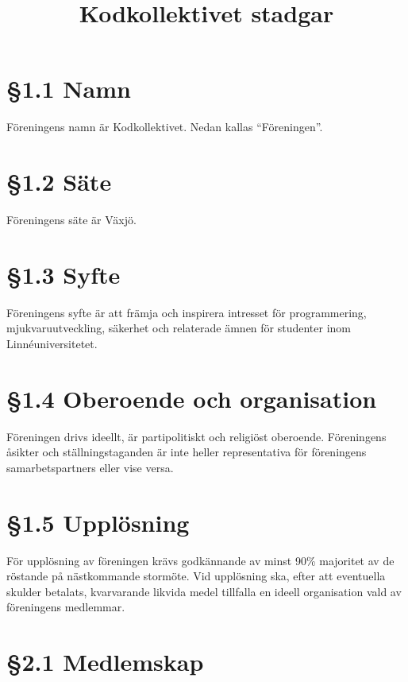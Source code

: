 \documentclass[]{article}
\title{Kodkollektivet stadgar}
\date{}
\begin{document}
\maketitle

\section{§1.1 Namn}\label{namn}

Föreningens namn är Kodkollektivet. Nedan kallas ``Föreningen''.

\section{§1.2 Säte}\label{suxe4te}

Föreningens säte är Växjö.

\section{§1.3 Syfte}\label{syfte}

Föreningens syfte är att främja och inspirera intresset för
programmering, mjukvaruutveckling, säkerhet och relaterade ämnen för
studenter inom Linnéuniversitetet.

\section{§1.4 Oberoende och
organisation}\label{oberoende-och-organisation}

Föreningen drivs ideellt, är partipolitiskt och religiöst oberoende.
Föreningens åsikter och ställningstaganden är inte heller representativa
för föreningens samarbetspartners eller vise versa.

\section{§1.5 Upplösning}\label{uppluxf6sning}

För upplösning av föreningen krävs godkännande av minst 90\% majoritet
av de röstande på nästkommande stormöte. Vid upplösning ska, efter att
eventuella skulder betalats, kvarvarande likvida medel tillfalla en
ideell organisation vald av föreningens medlemmar.

\section{§2.1 Medlemskap}\label{medlemskap}
\end{document}
